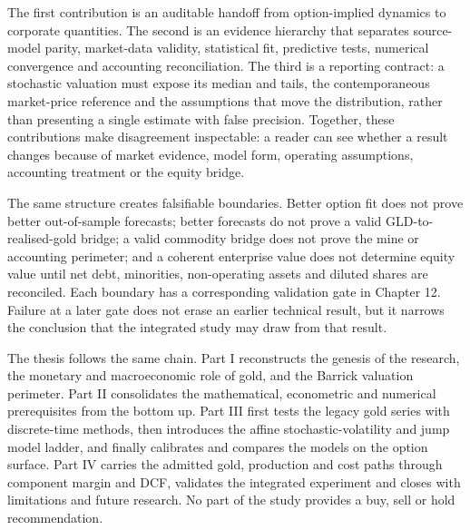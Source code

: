 The first contribution is an auditable handoff from option-implied dynamics to
corporate quantities. The second is an evidence hierarchy that separates
source-model parity, market-data validity, statistical fit, predictive tests,
numerical convergence and accounting reconciliation. The third is a reporting
contract: a stochastic valuation must expose its median and tails, the
contemporaneous market-price reference and the assumptions that move the
distribution, rather than presenting a single estimate with false precision.
Together, these contributions make disagreement inspectable: a reader can see
whether a result changes because of market evidence, model form, operating
assumptions, accounting treatment or the equity bridge.

The same structure creates falsifiable boundaries. Better option fit does not
prove better out-of-sample forecasts; better forecasts do not prove a valid
GLD-to-realised-gold bridge; a valid commodity bridge does not prove the mine
or accounting perimeter; and a coherent enterprise value does not determine
equity value until net debt, minorities, non-operating assets and diluted
shares are reconciled. Each boundary has a corresponding validation gate in
Chapter 12. Failure at a later gate does not erase an earlier technical
result, but it narrows the conclusion that the integrated study may draw from
that result.

The thesis follows the same chain. Part I reconstructs the genesis of the
research, the monetary and macroeconomic role of gold, and the Barrick
valuation perimeter. Part II consolidates the mathematical, econometric and
numerical prerequisites from the bottom up. Part III first tests the legacy
gold series with discrete-time methods, then introduces the affine
stochastic-volatility and jump model ladder, and finally calibrates and
compares the models on the option surface. Part IV carries the admitted gold,
production and cost paths through component margin and DCF, validates the integrated
experiment and closes with limitations and future research. No part of the
study provides a buy, sell or hold recommendation.

